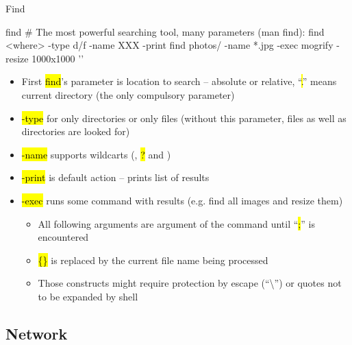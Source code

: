 \documentclass[compress, ucs, xelatex, 11pt, xcolor=svgnames,
  hyperref={
    bookmarks=true,
    unicode=true,
    colorlinks=true,
    pdftitle={Linux, command line and MetaCentrum},
    plainpages=false,
    pdfauthor={Vojtech Zeisek},
    pdfsubject={Course about use of Linux command line, writing shell scripts and using MetaCentrum of CESNET},
    pdfcreator={XeLaTeX},
    pdfkeywords={Linux, GNU, BASH, shell, command line, MetaCentrum},
    linkcolor=Red,
    anchorcolor=Blue,
    citecolor=Purple,
    filecolor=DodgerBlue,
    menucolor=DarkOrchid,
    urlcolor=DeepSkyBlue,
    pdftex},
  url={hyphens, lowtilde} %
  ]{beamer}
\renewcommand{\texttt}[1]{\hl{\ttfamily #1}}
\begin{document}
\begin{frame}[fragile]{Find}
  \begin{bashcode}
    find # The most powerful searching tool, many parameters (man find):
    find <where> -type d/f -name XXX -print
    find photos/ -name *.jpg -exec mogrify -resize 1000x1000 '{}' \;
  \end{bashcode}
  \begin{itemize}
    \item First \texttt{find}'s parameter is location to search -- absolute or relative, ``\texttt{.}'' means current directory (the only compulsory parameter)
    \item \texttt{-type} for only directories or only files (without this parameter, files as well as directories are looked for)
    \item \texttt{-name} supports wildcarts (\texttt{*}, \texttt{?} and \texttt{[\ldots]})
    \item \texttt{-print} is default action -- prints list of results
    \item \texttt{-exec} runs some command with results (e.g. find all images and resize them)
    \begin{itemize}
      \item All following arguments are argument of the command until ``\texttt{;}'' is encountered
      \item \texttt{\{\}} is replaced by the current file name being processed
      \item Those constructs might require protection by escape (``\textbackslash'') or quotes not to be expanded by shell
    \end{itemize}
  \end{itemize}
\end{frame}

\subsection{Network}
\end{document}
